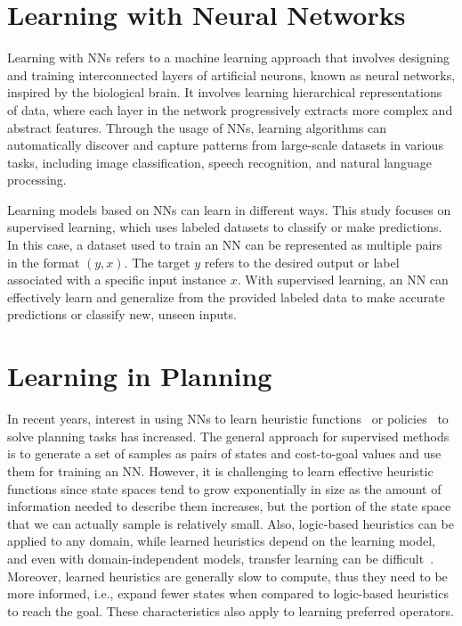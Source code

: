 \documentclass[ppgc,diss,english]{iiufrgs}
\begin{document}
\section{Learning with Neural Networks}
\label{sec:intro-deep-learning}
Learning with NNs refers to a machine learning approach that involves designing and training interconnected layers of artificial neurons, known as neural networks, inspired by the biological brain.
It involves learning hierarchical representations of data, where each layer in the network progressively extracts more complex and abstract features. Through the usage of NNs, learning algorithms can automatically discover and capture patterns from large-scale datasets in various tasks, including image classification, speech recognition, and natural language processing.

Learning models based on NNs can learn in different ways. This study focuses on supervised learning, which uses labeled datasets to classify or make predictions. In this case, a dataset used to train an NN can be represented as multiple pairs in the format $(y, x)$. The target $y$ refers to the desired output or label associated with a specific input instance $x$. With supervised learning, an NN can effectively learn and generalize from the provided labeled data to make accurate predictions or classify new, unseen inputs.

\section{Learning in Planning}
\label{sec:intro-learning-planning}
In recent years, interest in using NNs to learn heuristic functions~\cite{Ferber.etal/2020a,Yu.etal/2020,Shen.etal/2020,Ferber.etal/2022,OToole/2022,Bettker.etal/2022} or policies~\cite{Toyer.etal/2018,Toyer.etal/2020,Stahlberg.etal/2022} to solve planning tasks has increased. The general approach for supervised methods is to generate a set of samples as pairs of states and cost-to-goal values and use them for training an NN. However, it is challenging to learn effective heuristic functions since state spaces tend to grow exponentially in size as the amount of information needed to describe them increases, but the portion of the state space that we can actually sample is relatively small. Also, logic-based heuristics can be applied to any domain, while learned heuristics depend on the learning model, and even with domain-independent models, transfer learning can be difficult~\cite{Shen.etal/2020}. Moreover, learned heuristics are generally slow to compute, thus they need to be more informed, i.e., expand fewer states when compared to logic-based heuristics to reach the goal. These characteristics also apply to learning preferred operators.
\end{document}
